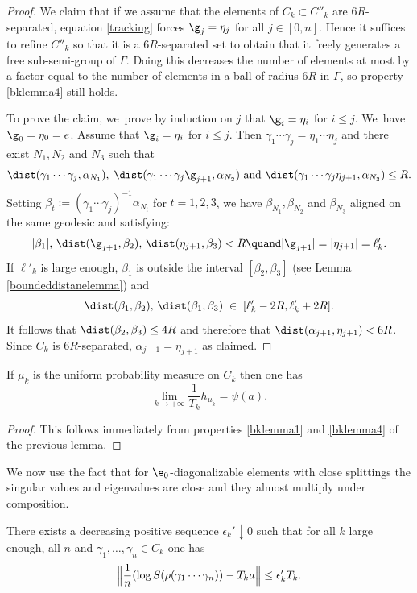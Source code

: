 \begin{proof}
We claim that if we assume that the elements of \(C_k \subset C''_k \) are \(6R\)-separated, equation \eqref{tracking} forces \(\g_j = \eta_j \) for all \(j \in [0, n]\).
Hence it suffices to refine \(C''_k\) so that it is a \(6R\)-separated set to obtain that it freely generates a free sub-semi-group of \(\Gamma\). Doing this decreases the number of elements at most by a factor equal to the number of elements in a ball of radius \(6R\) in \(\Gamma\), so property \eqref{bklemma4} still holds.

To prove the claim, we~prove by induction on \(j\) that \(\g_i = \eta_i \) for \(i \le j\). We~have \(\g_0 = \eta_0 = e\). Assume that \(\g_i = \eta_i \) for \(i \le j\). Then
\(\gamma_1\cdots \gamma_j = \eta_1\cdots \eta_j\) and there exist \(N_1, N_2\) and \(N_3\) such that
\[
 \dist (\gamma_1\cdots \gamma_j, \alpha_{N_1}),\;\dist (\gamma_1\cdots \gamma_j\g_{j+1}, \alpha_{N_2}) {\textrm { and }}\dist (\gamma_1\cdots \gamma_j\eta_{j+1}, \alpha_{N_3}) \le R.
\]
Setting \(\beta_t := (\gamma_1\cdots \gamma_j)^{-1} \alpha_{N_t} \) for \(t = 1,2,3\), we have \(\beta_{N_1}, \beta_{N_2}\) and \(\beta_{N_3} \) aligned on the same geodesic and satisfying:
\[
 |\beta_1|,\, \dist (\g_{j+1}, \beta_2),\, \dist (\eta_{j+1}, \beta_3) < R \quand |\g_{j+1}|= |\eta_{j+1}| = \ell'_k.
\]
If \(\ell'_k\) is large enough, \(\beta_1 \) is outside the interval \([\beta_2, \beta_3]\) (see Lemma \ref{boundeddistanelemma}) and
\[
 \dist (\beta_1, \beta_2),\, \dist (\beta_1, \beta_3) \; \in \; [\ell'_k -2R, \ell'_k +2R ].
\]
It follows that \(\dist (\beta_2, \beta_3) \le 4R\) and therefore that \(\dist (\alpha_{j+1}, \eta_{j+1}) < 6R\). Since \(C_k\) is \(6R\)-separated, \(\alpha_{j+1} = \eta_{j+1}\) as claimed.
\end{proof}

\begin{corollary}
If \(\mu_k\) is the uniform probability measure on \(C_k\) then one has
\[
\lim_{k \to +\infty}\frac{1}{T_k}h_{\mu_k} = \psi(a).
\]
\end{corollary}
\begin{proof}
This follows immediately from properties \eqref{bklemma1} and \eqref{bklemma4} of the previous lemma.
\end{proof}

We now use the fact that for \(\e_0\)-diagonalizable elements with close splittings the singular values and eigenvalues are close and they almost multiply under composition.
\begin{lemma}
There exists a decreasing positive sequence \(\epsilon_k' \downarrow 0\) such that for all \(k\) large enough, all \(n\) and \(\gamma_1,\ldots, \gamma_n \in C_k\) one has
\[
\Bigl\|\frac{1}{n}(\log S(\rho(\gamma_1\cdots \gamma_n)) - T_k a\Bigr\| \le \epsilon_k' T_k.
\]
\end{lemma}

